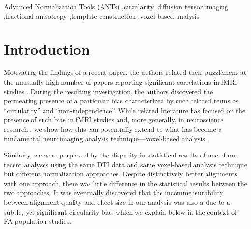 \documentclass[final,5p,times,twocolumn]{elsarticle}
\begin{document}
\begin{frontmatter}
\begin{keyword}
Advanced Normalization Tools (ANTs) \sep circularity\ diffusion tensor imaging \sep fractional anisotropy \sep template construction \sep voxel-based analysis
\end{keyword}

\end{frontmatter}
%
%
\newpage





\section{Introduction}
Motivating the findings of a recent paper, the authors related their
puzzlement at the unusually high number of papers reporting 
significant correlations in fMRI studies \cite{Vul2009}. During the 
resulting investigation, the authors discovered the permeating
presence of a particular bias characterized by such related terms as ``circularity''
and ``non-independence''.
While related literature has focused on the presence of such bias in 
fMRI studies \cite{Vul2009,Vul2010} and, more generally, in neuroscience research 
\cite{Kriegeskorte2009}, we show how this can potentially extend to what has
become a fundamental neuroimaging analysis technique---voxel-based analysis.

Similarly, we were perplexed by the disparity in statistical results of one of 
our recent analyses \cite{Stone2011} using the same DTI data and same 
voxel-based analysis technique but different normalization approaches.  Despite 
distinctively better alignments with one approach, there was little 
difference in the statistical results between the two approaches.  
It was eventually discovered that the 
incommensurability between alignment quality and effect size in our
analysis was also a due to a subtle, yet significant circularity bias
which we explain below in the context of FA population studies.  

\end{document}
